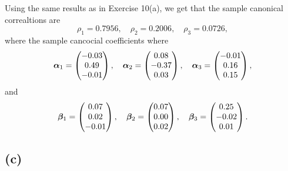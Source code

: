 Using the same results as in Exercise 10(a), we get that the sample
canonical correaltions are
\begin{equation*}
  \rho_{1} =0.7956 , \quad \rho_{2} =  0.2006,\quad  \rho_{3} = 0.0726,
\end{equation*}
where the sample cancocial coefficients where
\begin{equation*}
  \bm{\alpha}_{1} =
  \begin{pmatrix}
    -0.03 \\ 
    0.49 \\ 
    -0.01
  \end{pmatrix}, \quad
  \bm{\alpha}_{2} =
  \begin{pmatrix}
    0.08 \\ 
    -0.37 \\ 
    0.03      
  \end{pmatrix}, \quad
  \bm{\alpha}_{3} =
  \begin{pmatrix}
    -0.01 \\ 
    0.16 \\ 
    0.15
  \end{pmatrix},
\end{equation*}
and
\begin{equation*}
  \bm{\beta}_{1} =
  \begin{pmatrix}
    0.07 \\ 
    0.02 \\ 
    -0.01 
  \end{pmatrix}, \quad
  \bm{\beta}_{2} =
  \begin{pmatrix}
    0.07 \\ 
    0.00 \\ 
    0.02  
  \end{pmatrix}, \quad
  \bm{\beta}_{3} =
  \begin{pmatrix}
    0.25 \\ 
    -0.02 \\ 
    0.01  
  \end{pmatrix}.
\end{equation*}

\subsection*{(c)}
\label{sec:c-9}

